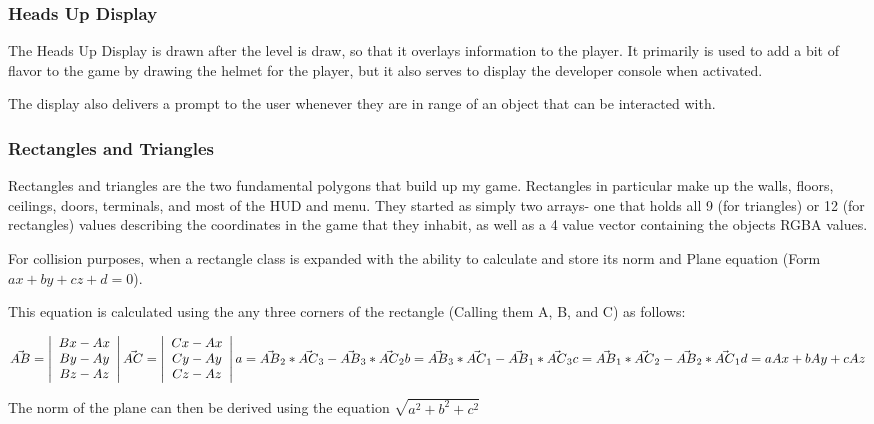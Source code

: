 \documentclass{article}
\begin{document}
\subsubsection{Heads Up Display}
The Heads Up Display is drawn after the level is draw, so that it overlays information to the player. It primarily is used to add a bit of flavor to the game by drawing the helmet for the player, but it also serves to display the developer console when activated.

The display also delivers a prompt to the user whenever they are in range of an object that can be interacted with.

\subsubsection{Rectangles and Triangles}
Rectangles and triangles are the two fundamental polygons that build up my game. Rectangles in particular make up the walls, floors, ceilings, doors, terminals, and most of the HUD and menu. They started as simply two arrays- one that holds all 9 (for triangles) or 12 (for rectangles) values describing the coordinates in the game that they inhabit, as well as a 4 value vector containing the objects RGBA values.

For collision purposes, when a rectangle class is expanded with the ability to calculate and store its norm and Plane equation (Form $ax + by + cz + d = 0$).

This equation is calculated using the any three corners of the rectangle (Calling them A, B, and C) as follows:

\noindent
$
\vec{AB} = \left| \begin{array}{c}
	Bx - Ax \\
	By - Ay \\
	Bz - Az
 \end{array} \right|
\vec{AC} = \left| \begin{array}{c}
	Cx - Ax \\
	Cy - Ay \\
	Cz - Az
 \end{array} \right| \\
a = \vec{AB}_2 * \vec{AC}_3 - \vec{AB}_3 * \vec{AC}_2 \\
b = \vec{AB}_3 * \vec{AC}_1 - \vec{AB}_1 * \vec{AC}_3 \\
c = \vec{AB}_1 * \vec{AC}_2 - \vec{AB}_2 * \vec{AC}_1 \\
d = aAx + bAy + cAz
$

The norm of the plane can then be derived using the equation $\sqrt{a^2 + b^2 + c^2}$
\end{document}
